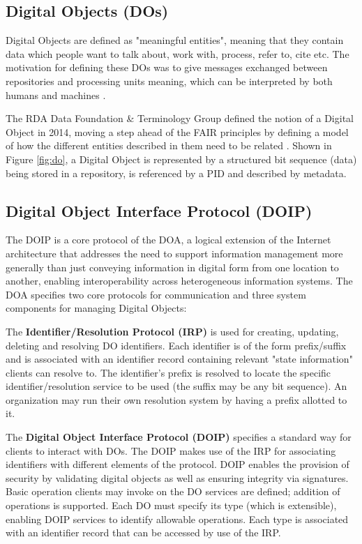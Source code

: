 \documentclass[conference]{IEEEtran}
\begin{document}
\subsection{Digital Objects (DOs)}
\label{sec:digital_objects}

Digital Objects are defined as "meaningful entities", meaning that they contain data which people want to talk about, work with, process, refer to, cite etc. The motivation for defining these DOs was to give messages exchanged between repositories and processing units meaning, which can be interpreted by both humans and machines \cite{wittenburg2019persistent}.

The RDA Data Foundation \& Terminology Group defined the notion of a Digital Object in 2014, moving a step ahead of the FAIR principles by defining a model of how the different entities described in them need to be related \cite{wittenburg2019persistent}. Shown in Figure \ref{fig:do}, a Digital Object is represented by a structured bit sequence (data) being stored in a repository, is referenced by a PID and described by metadata. 

\subsection{Digital Object Interface Protocol (DOIP)}
\label{sec:doip}

The DOIP \cite{dona2018digital} is a core protocol of the DOA, a logical extension of the Internet architecture that addresses the need to support information management more generally than just conveying information in digital form from one location to another, enabling interoperability across heterogeneous information systems. The DOA specifies two core protocols for communication and three system components for managing Digital Objects:

The \textbf{Identifier/Resolution Protocol (IRP)} is used for creating, updating, deleting and resolving DO identifiers. Each identifier is of the form prefix/suffix and is associated with an identifier record containing relevant "state information" clients can resolve to. The identifier's prefix is resolved to locate the specific identifier/resolution service to be used (the suffix may be any bit sequence). An organization may run their own resolution system by having a prefix allotted to it.

The \textbf{Digital Object Interface Protocol (DOIP)} specifies a standard way for clients to interact with DOs. The DOIP makes use of the IRP for associating identifiers with different elements of the protocol. DOIP enables the provision of security by validating digital objects as well as ensuring integrity via signatures. Basic operation clients may invoke on the DO services are defined; addition of operations is supported. Each DO must specify its type (which is extensible), enabling DOIP services to identify allowable operations. Each type is associated with an identifier record that can be accessed by use of the IRP.
\end{document}
